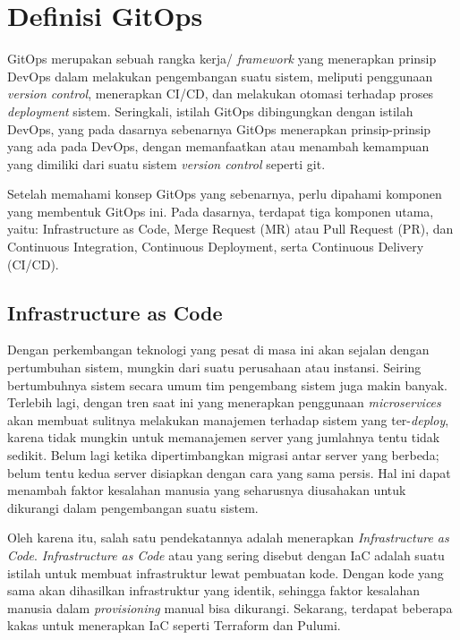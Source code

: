 \section{Definisi GitOps}

GitOps merupakan sebuah rangka kerja/ \textit{framework} yang menerapkan prinsip DevOps dalam melakukan pengembangan suatu sistem, meliputi penggunaan \textit{version control}, menerapkan CI/CD, dan melakukan otomasi terhadap proses \textit{deployment} sistem\cite{gitlab}. Seringkali, istilah GitOps dibingungkan dengan istilah DevOps, yang pada dasarnya sebenarnya GitOps menerapkan prinsip-prinsip yang ada pada DevOps, dengan memanfaatkan atau menambah kemampuan yang dimiliki dari suatu sistem \textit{version control} seperti git.

Setelah memahami konsep GitOps yang sebenarnya, perlu dipahami komponen yang membentuk GitOps ini. Pada dasarnya, terdapat tiga komponen utama, yaitu: Infrastructure as Code, Merge Request (MR) atau Pull Request (PR), dan Continuous Integration, Continuous Deployment, serta Continuous Delivery (CI/CD).

\subsection{Infrastructure as Code}

Dengan perkembangan teknologi yang pesat di masa ini akan sejalan dengan pertumbuhan sistem, mungkin dari suatu perusahaan atau instansi. Seiring bertumbuhnya sistem secara umum tim pengembang sistem juga makin banyak. Terlebih lagi, dengan tren saat ini yang menerapkan penggunaan \textit{microservices} akan membuat sulitnya melakukan manajemen terhadap sistem yang ter-\textit{deploy}, karena tidak mungkin untuk memanajemen server yang jumlahnya tentu tidak sedikit. Belum lagi ketika dipertimbangkan migrasi antar server yang berbeda; belum tentu kedua server disiapkan dengan cara yang sama persis. Hal ini dapat menambah faktor kesalahan manusia yang seharusnya diusahakan untuk dikurangi dalam pengembangan suatu sistem.

Oleh karena itu, salah satu pendekatannya adalah menerapkan \textit{Infrastructure as Code}. \textit{Infrastructure as Code} atau yang sering disebut dengan IaC adalah suatu istilah untuk membuat infrastruktur lewat pembuatan kode. Dengan kode yang sama akan dihasilkan infrastruktur yang identik, sehingga faktor kesalahan manusia dalam \textit{provisioning} manual bisa dikurangi. Sekarang, terdapat beberapa kakas untuk menerapkan IaC seperti Terraform dan Pulumi. 

